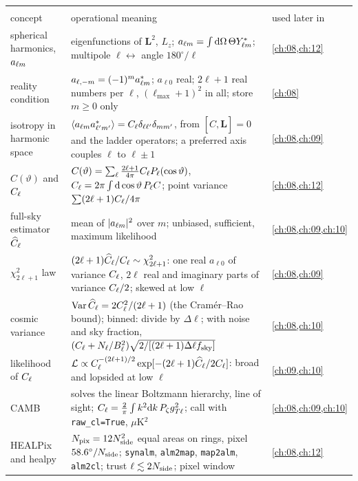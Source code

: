 \begin{center}
\small
\renewcommand{\arraystretch}{1.15}
\begin{tabularx}{\linewidth}{@{}>{\raggedright\arraybackslash}p{3.3cm}
                               >{\raggedright\arraybackslash}X
                               >{\raggedright\arraybackslash}p{2.5cm}@{}}
\toprule
\multicolumn{3}{@{}l}{\textbf{Fields on the sphere}}\\
concept & operational meaning & used later in\\\midrule
spherical harmonics, $a_{\ell m}$ & eigenfunctions of $\bm L^2$, $L_z$; $a_{\ell m}=\int\mathrm{d}\Omega\,\Theta Y^*_{\ell m}$; multipole $\ell\leftrightarrow$ angle $180^\circ/\ell$ & \cref{ch:08,ch:12}\\
reality condition & $a_{\ell,-m}=(-1)^ma_{\ell m}^*$; $a_{\ell0}$ real; $2\ell+1$ real numbers per $\ell$, $(\ell_{\max}+1)^2$ in all; store $m\ge0$ only & \cref{ch:08}\\
isotropy in harmonic space & $\langle a_{\ell m} a^*_{\ell'm'}\rangle=C_\ell\delta_{\ell\ell'}\delta_{mm'}$, from $[\hat C,\bm L]=0$ and the ladder operators; a preferred axis couples $\ell$ to $\ell\pm1$ & \cref{ch:08,ch:09}\\
$C(\vartheta)$ and $C_\ell$ & $C(\vartheta)=\sum_\ell\frac{2\ell+1}{4\pi}C_\ell P_\ell(\cos\vartheta)$, $C_\ell=2\pi\int\mathrm{d}\cos\vartheta\,P_\ell C$; point variance $\sum(2\ell+1)C_\ell/4\pi$ & \cref{ch:08,ch:12}\\
full-sky estimator $\widehat{C}_\ell$ & mean of $|a_{\ell m}|^2$ over $m$; unbiased, sufficient, maximum likelihood & \cref{ch:08,ch:09,ch:10}\\
$\chi^2_{2\ell+1}$ law & $(2\ell+1)\widehat{C}_\ell/C_\ell\sim\chi^2_{2\ell+1}$: one real $a_{\ell0}$ of variance $C_\ell$, $2\ell$ real and imaginary parts of variance $C_\ell/2$; skewed at low $\ell$ & \cref{ch:08,ch:09}\\
cosmic variance & $\operatorname{Var}\widehat{C}_\ell=2C_\ell^2/(2\ell+1)$ (the Cram\'er--Rao bound); binned: divide by $\Delta\ell$; with noise and sky fraction, $(C_\ell+N_\ell/B_\ell^2)\sqrt{2/[(2\ell+1)\Delta\ell f_{\mathrm{sky}}]}$ & \cref{ch:08,ch:10}\\
likelihood of $C_\ell$ & $\mathcal{L}\propto C_\ell^{-(2\ell+1)/2}\exp[-(2\ell+1)\widehat{C}_\ell/2C_\ell]$: broad and lopsided at low $\ell$ & \cref{ch:09,ch:10}\\
CAMB & solves the linear Boltzmann hierarchy, line of sight; $C_\ell=\frac2\pi\int k^2\mathrm{d} k\,P_\zeta g_{T\ell}^2$; call with \texttt{raw\_cl=True}, $\mu$K$^2$ & \cref{ch:08,ch:09,ch:10}\\
HEALPix and healpy & $N_{\rm pix}=12N_{\rm side}^2$ equal areas on rings, pixel $58.6^\circ/N_{\rm side}$; \texttt{synalm}, \texttt{alm2map}, \texttt{map2alm}, \texttt{alm2cl}; trust $\ell\lesssim2N_{\rm side}$; pixel window & \cref{ch:08,ch:12}\\

\end{tabularx}
\end{center}

